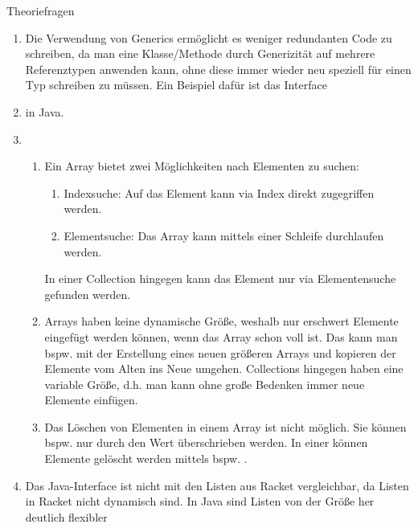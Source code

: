 \documentclass{../tuda-exercise}
\begin{document}
\begin{task}[credit=\stars{0}{3}]{Theoriefragen}
    \begin{solution}
      \begin{enumerate}
        \item Die Verwendung von Generics ermöglicht es weniger redundanten Code zu schreiben, da
        man eine Klasse/Methode durch Generizität auf mehrere Referenztypen anwenden kann, ohne
        diese immer wieder neu speziell für einen Typ schreiben zu müssen. Ein Beispiel dafür ist
        das Interface
        \item \href{https://docs.oracle.com/en/java/javase/11/docs/api/java.base/java/util/Collection.html}
        {} in Java.
        \item
        \begin{enumerate}
          [label=(\alph*)]
          \item Ein Array bietet zwei Möglichkeiten nach Elementen zu suchen:
          \begin{enumerate}
            \item Indexsuche: Auf das Element kann via Index direkt zugegriffen werden.
            \item Elementsuche: Das Array kann mittels einer Schleife durchlaufen werden.
          \end{enumerate}
          In einer Collection hingegen kann das Element nur via Elementensuche gefunden werden.
          \item Arrays haben keine dynamische Größe, weshalb nur erschwert Elemente eingefügt
          werden können, wenn das Array schon voll ist. Das kann man bspw. mit der Erstellung
          eines neuen größeren Arrays und kopieren der Elemente vom Alten ins Neue umgehen.
          Collections hingegen haben eine variable Größe, d.h. man kann ohne große Bedenken immer
          neue Elemente einfügen.
          \item Das Löschen von Elementen in einem Array ist nicht möglich. Sie können bspw. nur
          durch den Wert  überschrieben werden. In einer  können Elemente gelöscht werden mittels bspw. 
          .
        \end{enumerate}
        \item Das Java-Interface
        \href{https://docs.oracle.com/en/java/javase/11/docs/api/java.base/java/util/List.html}
        {} ist nicht mit den Listen aus Racket vergleichbar, da Listen
        in Racket nicht dynamisch sind. In Java sind Listen von der Größe her deutlich flexibler

\end{enumerate}
\end{solution}
\end{task}
\end{document}
